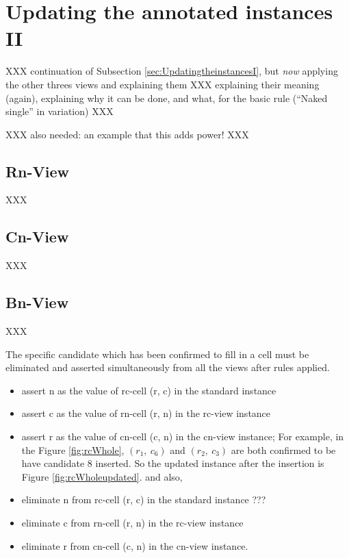 \documentclass[11pt]{report}
\begin{document}
\section{Updating the annotated instances II}
\label{sec:UpdatingtheinstancesII}

XXX continuation of Subsection \ref{sec:UpdatingtheinstancesI}, but \emph{now} applying the other threes views and explaining them XXX explaining their meaning (again), explaining why it can be done, and what, for the basic rule (``Naked single'' in variation) XXX

XXX also needed: an example that this adds power! XXX


\subsection{Rn-View}
\label{sec:basicrulern}

XXX

\subsection{Cn-View}
\label{sec:basicrulecn}

XXX


\subsection{Bn-View}
\label{sec:basicruleBn}

XXX



The specific candidate which has been confirmed to fill in a cell must be eliminated and asserted simultaneously from all the views after rules applied.
\begin{itemize}
\item assert n as the value of rc-cell (r, c) in the standard instance
\item assert c as the value of rn-cell (r, n) in the rc-view instance
\item assert r as the value of cn-cell (c, n) in the cn-view instance;
For example, in the Figure \ref{fig:rcWhole}, $(r_{1},\ c_{6})$ and $(r_{2},\ c_{3})$ are both confirmed to be have candidate 8 inserted. So the updated instance after the insertion is Figure \ref{fig:rcWholeupdated}. 
and also,
\item eliminate n from rc-cell (r, c) in the standard instance ???
\item eliminate c from rn-cell (r, n) in the rc-view instance
\item eliminate r from cn-cell (c, n) in the cn-view instance.
\end{itemize}
\end{document}

